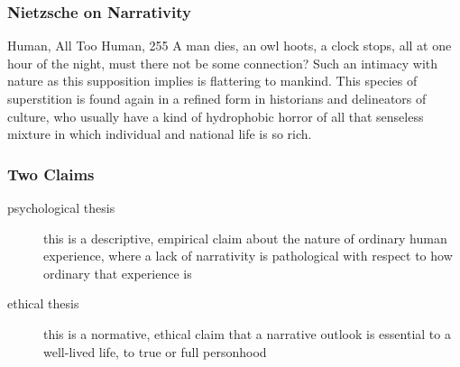 \documentclass[xcolor=dvipsnames]{beamer}
\begin{document}
\begin{frame}
  \frametitle{Nietzsche on Narrativity}
  \begin{block}{Human, All Too Human, 255}
    A man dies, an owl hoots, a clock stops, all at one hour of the
    night, must there not be some connection? Such an intimacy with
    nature as this supposition implies is flattering to mankind. This
    species of superstition is found again in a refined form in
    historians and delineators of culture, who usually have a kind of
    hydrophobic horror of all that senseless mixture in which
    individual and national life is so rich.
  \end{block}
\end{frame}

\begin{frame}
  \frametitle{Two Claims}
  \begin{description}
  \item[psychological thesis] this is a descriptive, empirical claim
    about the nature of ordinary human experience, where a lack of
    narrativity is pathological with respect to how ordinary that
    experience is
  \item[ethical thesis] this is a normative, ethical claim that a
    narrative outlook is essential to a well-lived life, to true or
    full personhood
  \end{description}
\end{frame}
\end{document}
